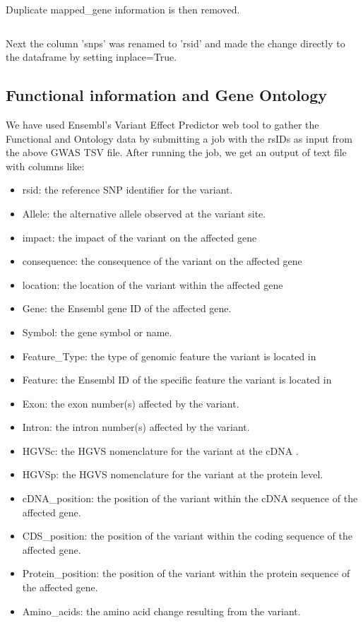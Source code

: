 \documentclass[12pt,a4paper]{article}
\newcommand{\mintfile}[1]{
\begin{tcolorbox}[colback=gray!5!white,%
	grow to left by=20mm,
    grow to right by=20mm,
    sharp corners]{{    \small \inputminted[breaklines]{python}{#1}		}}
\end{tcolorbox}}
\newcommand{\subsect}[1]{
\hypertarget{#1}{
\subsection{#1}\label{#1}}
}
\begin{document}
\mintfile{code_snippets/placeholder.py}
Duplicate mapped\_gene information is then removed.

\mintfile{code_snippets/placeholder.py}
Next the column 'snps' was renamed to 'rsid' and made the change directly to the dataframe by setting inplace=True.


\subsect{Functional information and Gene Ontology}

We have used Ensembl's Variant Effect Predictor web tool to gather the Functional and Ontology data by
submitting a job with the rsIDs as input from the above GWAS TSV file.
After running the job, we get an output of text file with columns like:

\begin{itemize}

\item rsid: the reference SNP identifier for the variant.
\item Allele: the alternative allele observed at the variant site.
\item impact: the impact of the variant on the affected gene
\item consequence: the consequence of the variant on the affected gene
\item location: the location of the variant within the affected gene
\item Gene: the Ensembl gene ID of the affected gene.
\item Symbol: the gene symbol or name.
\item Feature\_Type: the type of genomic feature the variant is located in
\item Feature: the Ensembl ID of the specific feature the variant is located in
\item Exon: the exon number(s) affected by the variant.
\item Intron: the intron number(s) affected by the variant.
\item HGVSc: the HGVS nomenclature for the variant at the cDNA .
\item HGVSp: the HGVS nomenclature for the variant at the protein level.
\item cDNA\_position: the position of the variant within the cDNA sequence of the affected gene.
\item CDS\_position: the position of the variant within the coding sequence of the affected gene.
\item Protein\_position: the position of the variant within the protein sequence of the affected gene.
\item Amino\_acids: the amino acid change resulting from the variant.

\end{itemize}
\end{document}
